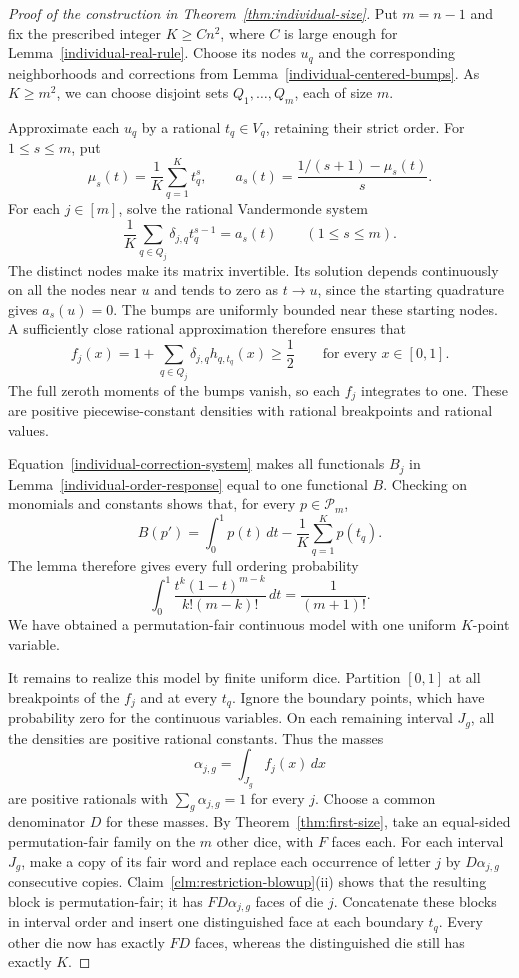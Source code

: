 \begin{proof}[Proof of the construction in Theorem~\ref{thm:individual-size}]
Put \(m=n-1\) and fix the prescribed integer \(K\geq Cn^2\), where
\(C\) is large enough for Lemma~\ref{individual-real-rule}.  Choose
its nodes \(u_q\) and the corresponding neighborhoods and corrections
from Lemma~\ref{individual-centered-bumps}.  As \(K\geq m^2\), we can
choose disjoint sets \(Q_1,\ldots,Q_m\), each of size \(m\).

Approximate each \(u_q\) by a rational \(t_q\in V_q\), retaining their
strict order.  For \(1\leq s\leq m\), put
\[
  \mu_s(t)=\frac1K\sum_{q=1}^K t_q^s,
  \qquad a_s(t)=\frac{1/(s+1)-\mu_s(t)}s.
\]
For each \(j\in[m]\), solve the rational Vandermonde system
\begin{equation}\label{individual-correction-system}
  \frac1K\sum_{q\in Q_j}\delta_{j,q}t_q^{s-1}=a_s(t)
  \qquad(1\leq s\leq m).
\end{equation}
The distinct nodes make its matrix invertible.  Its solution depends
continuously on all the nodes near \(u\) and tends to zero as \(t\to u\),
since the starting quadrature gives \(a_s(u)=0\).  The bumps are
uniformly bounded near these starting nodes.  A sufficiently close
rational approximation therefore ensures that
\[
  f_j(x)=1+\sum_{q\in Q_j}\delta_{j,q}h_{q,t_q}(x)\geq\frac12
  \qquad\text{for every }x\in[0,1].
\]
The full zeroth moments of the bumps vanish, so each \(f_j\) integrates
to one.  These are positive piecewise-constant densities with rational
breakpoints and rational values.

Equation~\eqref{individual-correction-system} makes all functionals
\(B_j\) in Lemma~\ref{individual-order-response} equal to one
functional \(B\).  Checking on monomials and constants shows that,
for every \(p\in\mathcal P_m\),
\[
  B(p')=\int_0^1p(t)\,dt-\frac1K\sum_{q=1}^Kp(t_q).
\]
The lemma therefore gives every full ordering probability
\[
  \int_0^1\frac{t^k(1-t)^{m-k}}{k!(m-k)!}\,dt
  =\frac1{(m+1)!}.
\]
We have obtained a permutation-fair continuous model with one uniform
\(K\)-point variable.

It remains to realize this model by finite uniform dice.  Partition
\([0,1]\) at all breakpoints of the \(f_j\) and at every \(t_q\).
Ignore the boundary points, which have probability zero for the
continuous variables.  On each remaining interval \(J_g\), all the
densities are positive rational constants.  Thus the masses
\[
  \alpha_{j,g}=\int_{J_g}f_j(x)\,dx
\]
are positive rationals with \(\sum_g\alpha_{j,g}=1\) for every \(j\).
Choose a common denominator \(D\) for these masses.  By
Theorem~\ref{thm:first-size}, take an equal-sided permutation-fair
family on the \(m\) other dice, with \(F\) faces each.  For each
interval \(J_g\), make a copy of its fair word and replace each
occurrence of letter \(j\) by \(D\alpha_{j,g}\) consecutive copies.
Claim~\ref{clm:restriction-blowup}(ii) shows that the resulting block
is permutation-fair; it has \(FD\alpha_{j,g}\) faces of die \(j\).
Concatenate these blocks in interval order and insert one distinguished
face at each boundary \(t_q\).  Every other die now has exactly \(FD\)
faces, whereas the distinguished die still has exactly \(K\).


\end{proof}
